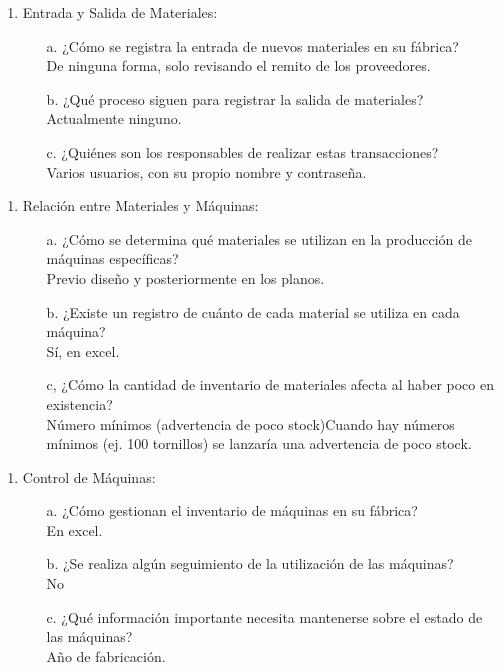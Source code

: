 \documentclass{article}
\begin{document}
    \begin{enumerate}[start=3]
        \item Entrada y Salida de Materiales:
            \begin{enumerate}[label=\Alph*.]
                \item[a.]  ¿Cómo se registra la entrada de nuevos materiales en su fábrica? \\
                    De ninguna forma, solo revisando el remito de los proveedores.
                \item[b.] ¿Qué proceso siguen para registrar la salida de materiales? \\
                	Actualmente ninguno.
                \item[c.] ¿Quiénes son los responsables de realizar estas transacciones? \\
                    Varios usuarios, con su propio nombre y contraseña.
            \end{enumerate}
    \end{enumerate}

    \begin{enumerate}[start=4]
        \item Relación entre Materiales y Máquinas:
            \begin{enumerate}[label=\Alph*.]
                \item[a.] ¿Cómo se determina qué materiales se utilizan en la producción de máquinas específicas? \\
                    Previo diseño y posteriormente en los planos.
                \item[b.]  ¿Existe un registro de cuánto de cada material se utiliza en cada máquina? \\
                    Sí, en excel.
                \item[c,] ¿Cómo la cantidad de inventario de materiales afecta al haber poco en existencia? \\
                    Número mínimos (advertencia de poco stock)Cuando hay números mínimos (ej. 100 tornillos) se lanzaría una advertencia de poco stock.
            \end{enumerate}
    \end{enumerate}

    \begin{enumerate}[start=5]
        \item Control de Máquinas:
            \begin{enumerate}[label=\Alph*.]
                \item[a.] ¿Cómo gestionan el inventario de máquinas en su fábrica? \\
                    En excel.
                \item[b.] ¿Se realiza algún seguimiento de la utilización de las máquinas? \\
                    No
                \item[c.] ¿Qué información importante necesita mantenerse sobre el estado de las máquinas? \\
                    Año de fabricación.
            \end{enumerate}
    \end{enumerate}

    
\end{document}

